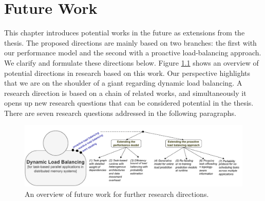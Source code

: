 \chapter{Future Work}
\label{ch:Future}
\noindent


This chapter introduces potential works in the future as extensions from the thesis. The proposed directions are mainly based on two branches: the first with our performance model and the second with a proactive load-balancing approach. We clarify and formulate these directions below. Figure \ref{fig:future_work_overview} shows an overview of potential directions in research based on this work. Our perspective highlights that we are on the shoulder of a giant regarding dynamic load balancing. A research direction is based on a chain of related works, and simultaneously it opens up new research questions that can be considered potential in the thesis. There are seven research questions addressed in the following paragraphs.\\

\begin{figure}[ht]
  \centering
  \includegraphics[scale=0.825]{./pictures/future_work/future_work_overview.pdf}
	\caption{An overview of future work for further research directions.}
	\label{fig:future_work_overview}
\end{figure}

